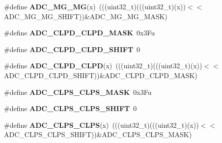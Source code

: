\begin{DoxyCompactItemize}
\mbox{\label{group___a_d_c___register___masks_gaca09277ff124324eca091b84eb116176}} 
\#define {\bfseries A\+D\+C\+\_\+\+M\+G\+\_\+\+MG}(x)~(((uint32\+\_\+t)(((uint32\+\_\+t)(x))$<$$<$A\+D\+C\+\_\+\+M\+G\+\_\+\+M\+G\+\_\+\+S\+H\+I\+FT))\&A\+D\+C\+\_\+\+M\+G\+\_\+\+M\+G\+\_\+\+M\+A\+SK)
\item 
\mbox{\label{group___a_d_c___register___masks_gaae8d6090ede9d73497ae3e0b4fa2c6cd}} 
\#define {\bfseries A\+D\+C\+\_\+\+C\+L\+P\+D\+\_\+\+C\+L\+P\+D\+\_\+\+M\+A\+SK}~0x3\+Fu
\item 
\mbox{\label{group___a_d_c___register___masks_ga14a354b0de262fc93f30472e99bbe9bc}} 
\#define {\bfseries A\+D\+C\+\_\+\+C\+L\+P\+D\+\_\+\+C\+L\+P\+D\+\_\+\+S\+H\+I\+FT}~0
\item 
\mbox{\label{group___a_d_c___register___masks_gad24bf778e8245118707b43a195a7ddf3}} 
\#define {\bfseries A\+D\+C\+\_\+\+C\+L\+P\+D\+\_\+\+C\+L\+PD}(x)~(((uint32\+\_\+t)(((uint32\+\_\+t)(x))$<$$<$A\+D\+C\+\_\+\+C\+L\+P\+D\+\_\+\+C\+L\+P\+D\+\_\+\+S\+H\+I\+FT))\&A\+D\+C\+\_\+\+C\+L\+P\+D\+\_\+\+C\+L\+P\+D\+\_\+\+M\+A\+SK)
\item 
\mbox{\label{group___a_d_c___register___masks_gaccedf61066feb0b1c6d6bd7794d2a79c}} 
\#define {\bfseries A\+D\+C\+\_\+\+C\+L\+P\+S\+\_\+\+C\+L\+P\+S\+\_\+\+M\+A\+SK}~0x3\+Fu
\item 
\mbox{\label{group___a_d_c___register___masks_ga94f5e6c337622e8c4b8d03201e1c2d11}} 
\#define {\bfseries A\+D\+C\+\_\+\+C\+L\+P\+S\+\_\+\+C\+L\+P\+S\+\_\+\+S\+H\+I\+FT}~0
\item 
\mbox{\label{group___a_d_c___register___masks_ga7b8e212b6c7c8504784c5af551e2b6bd}} 
\#define {\bfseries A\+D\+C\+\_\+\+C\+L\+P\+S\+\_\+\+C\+L\+PS}(x)~(((uint32\+\_\+t)(((uint32\+\_\+t)(x))$<$$<$A\+D\+C\+\_\+\+C\+L\+P\+S\+\_\+\+C\+L\+P\+S\+\_\+\+S\+H\+I\+FT))\&A\+D\+C\+\_\+\+C\+L\+P\+S\+\_\+\+C\+L\+P\+S\+\_\+\+M\+A\+SK)
\item 
\mbox{\label{group___a_d_c___register___masks_ga877d163ca4067627ebb29125d75eb757}} 
$$
\end{DoxyCompactItemize}
